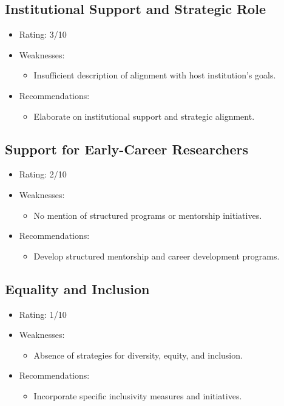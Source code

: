 \documentclass{article}
\begin{document}
\subsection{Institutional Support and Strategic Role}
\begin{itemize}
    \item Rating: 3/10
    \item Weaknesses:
        \begin{itemize}
            \item Insufficient description of alignment with host institution's goals.
        \end{itemize}
    \item Recommendations:
        \begin{itemize}
            \item Elaborate on institutional support and strategic alignment.
        \end{itemize}
\end{itemize}

\subsection{Support for Early-Career Researchers}
\begin{itemize}
    \item Rating: 2/10
    \item Weaknesses:
        \begin{itemize}
            \item No mention of structured programs or mentorship initiatives.
        \end{itemize}
    \item Recommendations:
        \begin{itemize}
            \item Develop structured mentorship and career development programs.
        \end{itemize}
\end{itemize}

\subsection{Equality and Inclusion}
\begin{itemize}
    \item Rating: 1/10
    \item Weaknesses:
        \begin{itemize}
            \item Absence of strategies for diversity, equity, and inclusion.
        \end{itemize}
    \item Recommendations:
        \begin{itemize}
            \item Incorporate specific inclusivity measures and initiatives.
        \end{itemize}
\end{itemize}
\end{document}
